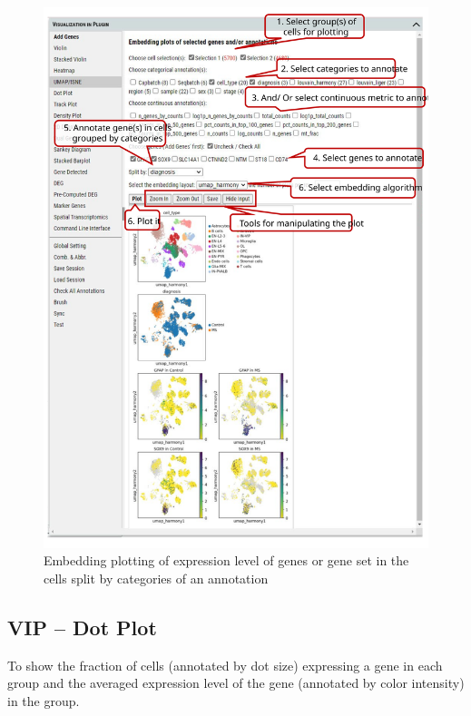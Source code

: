 \documentclass[
]{article}
\begin{document}
\begin{figure}
\centering
\includegraphics{figures/F10_label.svg}
\caption{Embedding plotting of expression level of genes or gene set in the cells split by categories of an annotation}
\end{figure}

\hypertarget{vip-dot-plot}{%
\subsection{VIP -- Dot Plot}\label{vip-dot-plot}}

To show the fraction of cells (annotated by dot size) expressing a gene in each group and the averaged expression level of the gene (annotated by color intensity) in the group.
\end{document}
